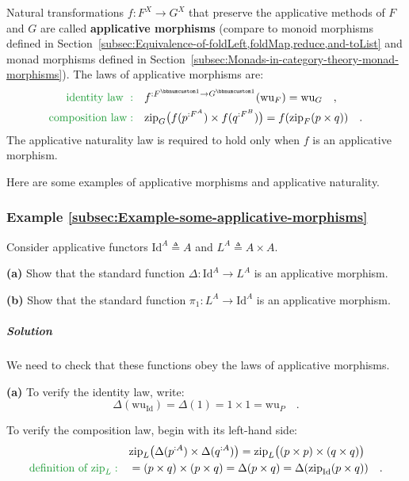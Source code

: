 Natural transformations $f:F^{X}\rightarrow G^{X}$ that preserve
the applicative methods of $F$ and $G$ are called \textbf{applicative
morphisms} (compare to monoid morphisms defined in Section~\ref{subsec:Equivalence-of-foldLeft,foldMap,reduce,and-toList}
and monad morphisms defined in Section~\ref{subsec:Monads-in-category-theory-monad-morphisms}).
The laws of applicative morphisms are:
\begin{align}
{\color{greenunder}\text{identity law }:}\quad & f^{:F^{\bbnum 1}\rightarrow G^{\bbnum 1}}(\text{wu}_{F})=\text{wu}_{G}\quad,\label{eq:identity-law-of-applicative-morphism}\\
{\color{greenunder}\text{composition law}:}\quad & \text{zip}_{G}\big(f(p^{:F^{A}})\times f(q^{:F^{B}})\big)=f(\text{zip}_{F}(p\times q))\quad.\label{eq:composition-law-of-applicative-morphism}
\end{align}
The applicative naturality law is required to hold only when $f$
is an applicative morphism.

Here are some examples of applicative morphisms and applicative naturality.

\subsubsection{Example \label{subsec:Example-some-applicative-morphisms}\ref{subsec:Example-some-applicative-morphisms}}

Consider applicative functors $\text{Id}^{A}\triangleq A$ and $L^{A}\triangleq A\times A$. 

\textbf{(a)} Show that the standard function $\Delta:\text{Id}^{A}\rightarrow L^{A}$
is an applicative morphism.

\textbf{(b)} Show that the standard function $\pi_{1}:L^{A}\rightarrow\text{Id}^{A}$
is an applicative morphism. 

\subparagraph{Solution}

We need to check that these functions obey the laws of applicative
morphisms.

\textbf{(a)} To verify the identity law, write:
\[
\Delta(\text{wu}_{\text{Id}})=\Delta(1)=1\times1=\text{wu}_{P}\quad.
\]

To verify the composition law, begin with its left-hand side:
\begin{align*}
 & \text{zip}_{L}\big(\Delta(p^{:A})\times\Delta(q^{:A})\big)=\text{zip}_{L}\big((p\times p)\times(q\times q)\big)\\
{\color{greenunder}\text{definition of }\text{zip}_{L}:}\quad & =(p\times q)\times(p\times q)=\Delta(p\times q)=\Delta(\text{zip}_{\text{Id}}(p\times q))\quad.
\end{align*}

